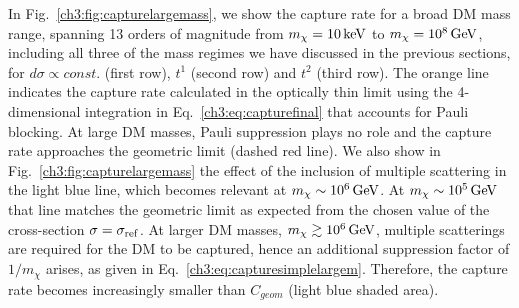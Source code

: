 In Fig.~\ref{ch3:fig:capturelargemass}, we show the capture rate for a broad DM mass range, spanning 13 orders of magnitude from $m_\chi=10{\rm \,keV}$ to $m_\chi=10^8{\rm \,GeV}$, including all three of the mass regimes we have discussed in the previous sections, for $d\sigma\propto const.$ (first row), $t^1$ (second row) and $t^2$ (third row).
The orange line indicates the capture rate calculated in the optically thin limit using the 4-dimensional integration in Eq.~\ref{ch3:eq:capturefinal} that accounts for Pauli blocking. 
At large DM masses, Pauli suppression plays no role and the capture rate approaches the geometric limit (dashed red line). 
We also show in Fig.~\ref{ch3:fig:capturelargemass} the effect of the inclusion of multiple scattering in the light blue line, which becomes relevant at $m_\chi\sim10^6{\rm \,GeV}$. 
At $m_\chi\sim 10^5{\rm \,GeV}$ that line matches the geometric limit as expected from the chosen value of the cross-section $\sigma=\sigma_\mathrm{ref}$. At larger DM masses, $m_\chi\gtrsim10^6{\rm \,GeV}$, multiple scatterings are required for the DM to be captured, hence an additional suppression factor of $1/m_\chi$ arises, as given in Eq.~\ref{ch3:eq:capturesimplelargem}. Therefore, the capture rate becomes increasingly smaller than $C_{geom}$ (light blue shaded area). 

